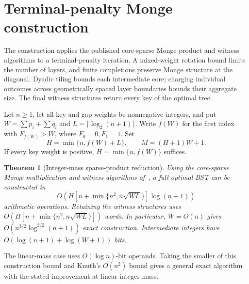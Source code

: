 \documentclass[11pt]{article}
\newtheorem{theorem}{Theorem}
\begin{document}
\section{Terminal-penalty Monge construction}
\label{sec:construction}

The construction applies the published core-sparse Monge product and
witness algorithms to a terminal-penalty iteration. A mixed-weight rotation
bound limits the number of layers, and finite completions preserve Monge
structure at the diagonal. Dyadic tiling bounds each intermediate core;
charging individual outcomes across geometrically spaced layer boundaries
bounds their aggregate size. The final witness structures return every key
of the optimal tree.

Let $n\ge1$, let all key and gap weights be nonnegative integers, and put
$W=\sum p_i+\sum q_i$ and $L=\lceil\log_2(n+1)\rceil$. Write $f(W)$ for
the first index with $F_{f(W)}>W$, where $F_0=0,F_1=1$. Set
\[
 H=\min\{n,f(W)+L\},\qquad M=(H+1)W+1.
\]
If every key weight is positive, $H=\min\{n,f(W)\}$ suffices.

\begin{theorem}[Integer-mass sparse-product reduction]\label{thm:penalty-reduction}
Using the core-sparse Monge multiplication and witness algorithms
of~\cite{coremonge}, a full optimal BST can be constructed in
\[
 O\!\left(H\left[n+\min\{n^2,n\sqrt{WL}\}\right]\log(n+1)\right)
\]
arithmetic operations. Retaining the witness structures uses
$O(H[n+\min\{n^2,n\sqrt{WL}\}])$ words. In particular, $W=O(n)$ gives
$O(n^{3/2}\log^{3/2}(n+1))$ exact construction. Intermediate integers have
$O(\log(n+1)+\log(W+1))$ bits.
\end{theorem}
The linear-mass case uses $O(\log n)$-bit operands. Taking the smaller
of this construction bound and Knuth's $O(n^2)$ bound gives a general
exact algorithm with the stated improvement at linear integer mass.
\end{document}
